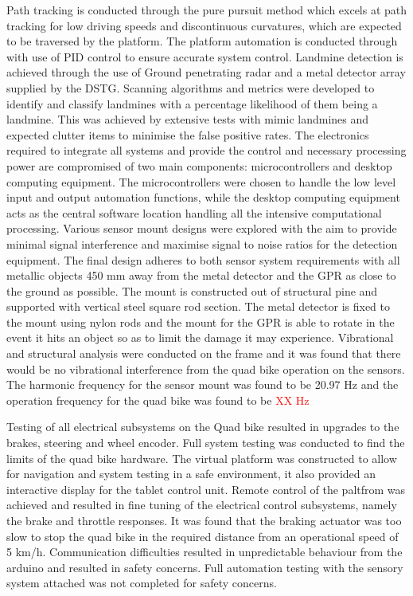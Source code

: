 \documentclass[main.tex]{subfiles}
\begin{document}
Path tracking is conducted through the pure pursuit method which excels at path tracking for low driving speeds and discontinuous curvatures, which are expected to be traversed by the platform.
The platform automation is conducted through with use of PID control to ensure accurate system control. Landmine detection is achieved through the use of Ground penetrating radar and a metal detector array supplied by the DSTG. Scanning algorithms and metrics were developed to identify and classify landmines with a percentage likelihood of them being a landmine. This was achieved by extensive tests with mimic landmines and expected clutter items to minimise the false positive rates. 
The electronics required to integrate all systems and provide the control and necessary processing power are compromised of two main components: microcontrollers and desktop computing equipment. 
The microcontrollers were chosen to handle the low level input and output automation functions, while the desktop computing equipment acts as the central software location handling all the intensive computational processing. 
Various sensor mount designs were explored with the aim to provide minimal signal interference and maximise signal to noise ratios for the detection equipment. 
The final design adheres to both sensor system requirements with all metallic objects 450 mm away from the metal detector and the GPR as close to the ground as possible. 
The mount is constructed out of structural pine and supported with vertical steel square rod section. The metal detector is fixed to the mount using nylon rods and the mount for the GPR is able to rotate in the event it hits an object so as to limit the damage it may experience. Vibrational and structural analysis were conducted on the frame and it was found that there would be no vibrational interference from the quad bike operation on the sensors. The harmonic frequency for the sensor mount was found to be 20.97 Hz and the operation frequency for the quad bike was found to be \textcolor{red}{XX Hz} 
   
Testing of all electrical subsystems on the Quad bike resulted in upgrades to the brakes, steering and wheel encoder. Full system testing was conducted to find the limits of the quad bike hardware. The virtual platform was constructed to allow for navigation and system testing in a safe environment, it also provided an interactive display for the tablet control unit. Remote control of the paltfrom was achieved and resulted in fine tuning of the electrical control subsystems, namely the brake and throttle responses. It was found that the braking actuator was too slow to stop the quad bike in the required distance from an operational speed of 5 km/h. Communication difficulties resulted in unpredictable behaviour from the arduino and resulted in safety concerns. Full automation testing with the sensory system attached was not completed for safety concerns. 
\end{document}

